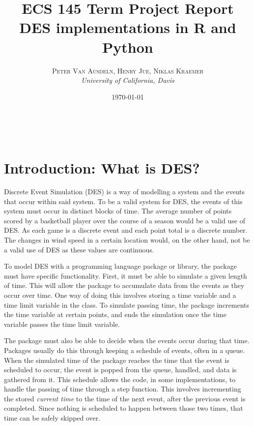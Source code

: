 \documentclass[a4paper, 11pt]{article} %
\title{\textbf{ECS 145 Term Project Report}\\ %
DES implementations in R and Python} %
\author{\textsc{Peter Van Ausdeln, Henry Jue, Niklas Kraemer} %
\\{\textit{University of California, Davis}}} %
\date{\today} %
\makeatletter
\renewcommand{\maketitle}{ %
\begin{flushright} %
{\LARGE\@title} %

\vspace{30pt} %

{\large\@author} %
\\\@date %

\vspace{30pt} %
\end{flushright}
}
\makeatother
\begin{document}
\maketitle %






\section*{Introduction: What is DES?}


Discrete Event Simulation (DES) is a way of modelling a system and the events that occur within said system. To be a valid system for DES, the events of this system must occur in distinct blocks of time. The average number of points scored by a basketball player over the course of a season would be a valid use of DES. As each game is a discrete event and each point total is a discrete number. The changes in wind speed in a certain location would, on the other hand, not be a valid use of DES as these values are continuous.


To model DES with a programming language package or library, the package must have specific functionality. First, it must be able to simulate a given length of time. This will allow the package to accumulate data from the events as they occur over time. One way of doing this involves storing a time variable and a time limit variable in the class. To simulate passing time, the package increments the time variable at certain points, and ends the simulation once the time variable passes the time limit variable.


The package must also be able to decide when the events occur during that time. Packages usually do this through keeping a schedule of events, often in a queue. When the simulated time of the package reaches the time that the event is scheduled to occur, the event is popped from the queue, handled, and data is gathered from it. This schedule allows the code, in some implementations, to handle the passing of time through a step function. This involves incrementing the stored \textit{current time} to the time of the next event, after the previous event is completed. Since nothing is scheduled to happen between those two times, that time can be safely skipped over.
\end{document}
